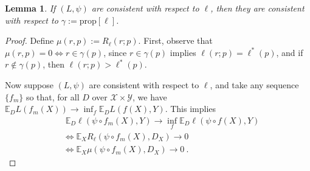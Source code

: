 \documentclass{article}
\newcommand{\Comments}{1}
\newcommand{\mynote}[2]{\ifnum\Comments=1\textcolor{#1}{#2}\fi}
\newcommand{\mytodo}[2]{\ifnum\Comments=1%
	\todo[linecolor=#1!80!black,backgroundcolor=#1,bordercolor=#1!80!black]{#2}\fi}
\newcommand{\raft}[1]{\mytodo{green!20!white}{RF: #1}}
\newcommand{\jessie}[1]{\mynote{purple}{[JF: #1]}}
\newcommand{\prop}[1]{\mathrm{prop}[#1]}
\newcommand{\propdis}{\mu}
\newcommand{\E}{\mathbb{E}}
\newcommand{\X}{\mathcal{X}}
\newcommand{\Y}{\mathcal{Y}}
\newcommand{\risk}[1]{#1^*}
\newtheorem{lemma}{Lemma}
\begin{document}
\begin{lemma}\label{lem:consistent-loss-implies-prop}
	If $(L, \psi)$ are consistent with respect to $\ell$, then they are consistent with respect to $\gamma := \prop{\ell}$.
\end{lemma}
\begin{proof}
	Define $\propdis(r, p) := R_\ell(r;p)$.
	First, observe that $\propdis(r,p) = 0 \iff r \in \gamma(p)$, since $r \in \gamma(p)$ implies $\ell(r;p) = \risk{\ell}(p)$, and if $r \not \in \gamma(p)$, then $\ell(r;p) > \risk{\ell}(p)$.
	
	Now suppose $(L, \psi)$ are consistent with respect to $\ell$, and take any sequence $\{f_m\}$ so that, for all $D$ over $\X \times \Y$, we have $\E_D L(f_m(X)) \to \inf_f \E_D L(f(X), Y)$.
	This implies 
	\begin{align*}
	&\; \E_D \ell(\psi \circ f_m(X), Y)\to \inf_f \E_D \ell(\psi \circ f(X), Y) \\
	&\iff \E_X R_\ell(\psi \circ f_m(X), D_X) \to 0\\
	&\iff \E_X \propdis(\psi \circ f_m(X), D_X) \to 0~.~
	\end{align*}
\end{proof}
\end{document}
